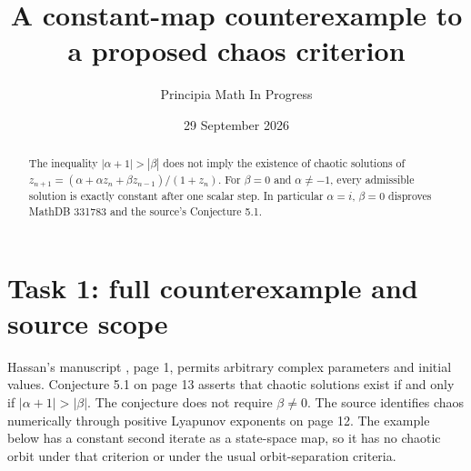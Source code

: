 \documentclass[11pt]{article}
\title{A constant-map counterexample to a proposed chaos criterion}
\author{Principia Math In Progress}
\date{29 September 2026}
\begin{document}
\maketitle
\begin{abstract}
The inequality $|\alpha+1|>|\beta|$ does not imply the existence of
chaotic solutions of $z_{n+1}=(\alpha+\alpha z_n+\beta z_{n-1})/(1+z_n)$.
For $\beta=0$ and $\alpha\ne-1$, every admissible solution is exactly
constant after one scalar step. In particular $\alpha=i$, $\beta=0$
disproves MathDB 331783 and the source's Conjecture 5.1.
\end{abstract}

\section*{Task 1: full counterexample and source scope}
Hassan's manuscript \cite{Hassan}, page 1, permits arbitrary complex
parameters and initial values. Conjecture 5.1 on page 13 asserts that
chaotic solutions exist if and only if $|\alpha+1|>|\beta|$.
The conjecture does not require $\beta\ne0$. The source identifies
chaos numerically through positive Lyapunov exponents on page 12.
The example below has a constant second iterate as a state-space map,
so it has no chaotic orbit under that criterion or under the usual
orbit-separation criteria.
\end{document}
